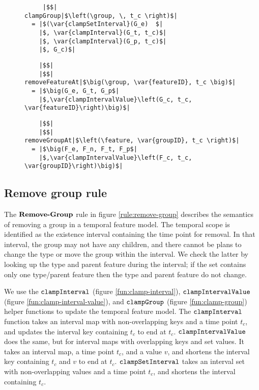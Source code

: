 \begin{figure}
\begin{minipage}{0.5\textwidth}
  \begin{verbatim}
     |$$|
clampGroup|$\left(\group, \, t_c \right)$|
  = |$(\var{clampSetInterval}(G_e)  $|
    |$, \var{clampInterval}(G_t, t_c)$|
    |$, \var{clampInterval}(G_p, t_c)$|
    |$, G_c)$|
  \end{verbatim}
\end{minipage}

\begin{minipage}{0.6\textwidth}
  \begin{verbatim}
    |$$|
    |$$|
removeFeatureAt|$\big(\group, \var{featureID}, t_c \big)$|
  = |$\big(G_e, G_t, G_p$|
    |$,\var{clampIntervalValue}\left(G_c, t_c, \var{featureID}\right)\big)$|
  \end{verbatim}
\end{minipage}

\begin{minipage}{0.6\textwidth}
  \begin{verbatim}
    |$$|
    |$$|
removeGroupAt|$\left(\feature, \var{groupID}, t_c \right)$|
  = |$\big(F_e, F_n, F_t, F_p$|
    |$,\var{clampIntervalValue}\left(F_c, t_c, \var{groupID}\right)\big)$|
  \end{verbatim}
\end{minipage}
\end{figure}

\subsection{Remove group rule}
\label{sub:remove-group-rule}
The $\textbf{Remove-Group}$ rule in figure \vref{rule:remove-group} describes the semantics of removing a group in a temporal feature model. The temporal scope is identified as the existence interval containing the time point for removal. In that interval, the group may not have any children, and there cannot be plans to change the type or move the group within the interval. We check the latter by looking up the type and parent feature during the interval; if the set contains only one type/parent feature then the type and parent feature do not change. 

We use the $\texttt{clampInterval}$ (figure \vref{fun:clamp-interval}), $\texttt{clampIntervalValue}$ (figure \vref{fun:clamp-interval-value}), and $\texttt{clampGroup}$ (figure \vref{fun:clamp-group}) helper functions to update the temporal feature model.  The $\texttt{clampInterval}$ function takes an interval map with non-overlapping keys and a time point $t_c$, and updates the interval key containing $t_c$ to end at $t_c$. $\texttt{clampIntervalValue}$ does the same, but for interval maps with overlapping keys and set values. It takes an interval map, a time point $t_c$, and a value $v$, and shortens the interval key containing $t_c$ and $v$ to end at $t_c$. $\texttt{clampSetInterval}$ takes an interval set with non-overlapping values and a time point $t_c$, and shortens the interval containing $t_c$. 


